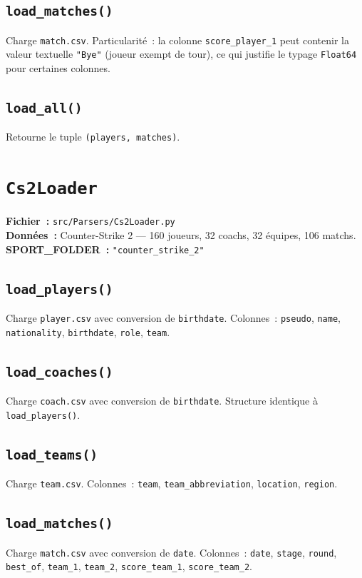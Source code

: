 \documentclass[12pt,a4paper]{article}
\begin{document}
\subsection{\texttt{load\_matches()}}
Charge \texttt{match.csv}. Particularité~: la colonne \texttt{score\_player\_1}
peut contenir la valeur textuelle \texttt{"Bye"} (joueur exempt de tour), ce
qui justifie le typage \texttt{Float64} pour certaines colonnes.

\subsection{\texttt{load\_all()}}
Retourne le tuple \texttt{(players, matches)}.

\section{\texttt{Cs2Loader}}

\textbf{Fichier~:} \texttt{src/Parsers/Cs2Loader.py}\\
\textbf{Données~:} Counter-Strike 2 — 160 joueurs, 32 coachs, 32 équipes,
106 matchs.\\
\textbf{SPORT\_FOLDER~:} \texttt{"counter\_strike\_2"}

\subsection{\texttt{load\_players()}}
Charge \texttt{player.csv} avec conversion de \texttt{birthdate}.
Colonnes~: \texttt{pseudo}, \texttt{name}, \texttt{nationality},
\texttt{birthdate}, \texttt{role}, \texttt{team}.

\subsection{\texttt{load\_coaches()}}
Charge \texttt{coach.csv} avec conversion de \texttt{birthdate}.
Structure identique à \texttt{load\_players()}.

\subsection{\texttt{load\_teams()}}
Charge \texttt{team.csv}. Colonnes~: \texttt{team}, \texttt{team\_abbreviation},
\texttt{location}, \texttt{region}.

\subsection{\texttt{load\_matches()}}
Charge \texttt{match.csv} avec conversion de \texttt{date}. Colonnes~:
\texttt{date}, \texttt{stage}, \texttt{round}, \texttt{best\_of},
\texttt{team\_1}, \texttt{team\_2}, \texttt{score\_team\_1},
\texttt{score\_team\_2}.
\end{document}
